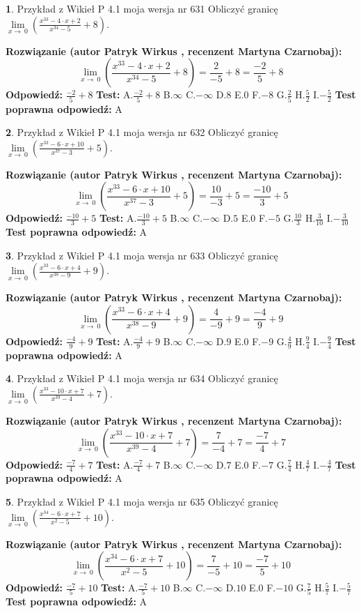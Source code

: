 \documentclass[12pt, a4paper]{article}
\theoremstyle{definition} %
\newtheorem{zad}{}
\newcommand{\zadStart}[1]{\begin{zad}#1\newline}
\newcommand{\zadStop}{\end{zad}}
\newcommand{\rozwStart}[2]{\noindent \textbf{Rozwiązanie (autor #1 , recenzent #2): }\newline}
\newcommand{\rozwStop}{\newline}
\newcommand{\odpStart}{\noindent \textbf{Odpowiedź:}\newline}
\newcommand{\odpStop}{\newline}
\newcommand{\testStart}{\noindent \textbf{Test:}\newline}
\newcommand{\testStop}{\newline}
\newcommand{\kluczStart}{\noindent \textbf{Test poprawna odpowiedź:}\newline}
\newcommand{\kluczStop}{\newline}
\begin{document}
\zadStart{Przykład z Wikieł P 4.1 moja wersja nr 631}
Obliczyć granicę $\lim\limits_{x\to\ 0}(\frac{x^{33}-4 \cdot x +2}{x^{34}-5}+8)$.
\zadStop
\rozwStart{Patryk Wirkus}{Martyna Czarnobaj}
$$\lim\limits_{x\to\ 0}(\frac{x^{33}-4 \cdot x +2}{x^{34}-5}+8)=\frac{2}{-5}+8=\frac{-2}{5}+8$$
\rozwStop
\odpStart
$\frac{-2}{5}+8$
\odpStop
\testStart
A.$\frac{-2}{5}+8$
B.$\infty$
C.$-\infty$
D.$8$
E.$0$
F.$-8$
G.$\frac{2}{5}$
H.$\frac{5}{2}$
I.$-\frac{5}{2}$
\testStop
\kluczStart
A
\kluczStop



\zadStart{Przykład z Wikieł P 4.1 moja wersja nr 632}
Obliczyć granicę $\lim\limits_{x\to\ 0}(\frac{x^{33}-6 \cdot x +10}{x^{37}-3}+5)$.
\zadStop
\rozwStart{Patryk Wirkus}{Martyna Czarnobaj}
$$\lim\limits_{x\to\ 0}(\frac{x^{33}-6 \cdot x +10}{x^{37}-3}+5)=\frac{10}{-3}+5=\frac{-10}{3}+5$$
\rozwStop
\odpStart
$\frac{-10}{3}+5$
\odpStop
\testStart
A.$\frac{-10}{3}+5$
B.$\infty$
C.$-\infty$
D.$5$
E.$0$
F.$-5$
G.$\frac{10}{3}$
H.$\frac{3}{10}$
I.$-\frac{3}{10}$
\testStop
\kluczStart
A
\kluczStop



\zadStart{Przykład z Wikieł P 4.1 moja wersja nr 633}
Obliczyć granicę $\lim\limits_{x\to\ 0}(\frac{x^{33}-6 \cdot x +4}{x^{38}-9}+9)$.
\zadStop
\rozwStart{Patryk Wirkus}{Martyna Czarnobaj}
$$\lim\limits_{x\to\ 0}(\frac{x^{33}-6 \cdot x +4}{x^{38}-9}+9)=\frac{4}{-9}+9=\frac{-4}{9}+9$$
\rozwStop
\odpStart
$\frac{-4}{9}+9$
\odpStop
\testStart
A.$\frac{-4}{9}+9$
B.$\infty$
C.$-\infty$
D.$9$
E.$0$
F.$-9$
G.$\frac{4}{9}$
H.$\frac{9}{4}$
I.$-\frac{9}{4}$
\testStop
\kluczStart
A
\kluczStop



\zadStart{Przykład z Wikieł P 4.1 moja wersja nr 634}
Obliczyć granicę $\lim\limits_{x\to\ 0}(\frac{x^{33}-10 \cdot x +7}{x^{39}-4}+7)$.
\zadStop
\rozwStart{Patryk Wirkus}{Martyna Czarnobaj}
$$\lim\limits_{x\to\ 0}(\frac{x^{33}-10 \cdot x +7}{x^{39}-4}+7)=\frac{7}{-4}+7=\frac{-7}{4}+7$$
\rozwStop
\odpStart
$\frac{-7}{4}+7$
\odpStop
\testStart
A.$\frac{-7}{4}+7$
B.$\infty$
C.$-\infty$
D.$7$
E.$0$
F.$-7$
G.$\frac{7}{4}$
H.$\frac{4}{7}$
I.$-\frac{4}{7}$
\testStop
\kluczStart
A
\kluczStop



\zadStart{Przykład z Wikieł P 4.1 moja wersja nr 635}
Obliczyć granicę $\lim\limits_{x\to\ 0}(\frac{x^{34}-6 \cdot x +7}{x^{2}-5}+10)$.
\zadStop
\rozwStart{Patryk Wirkus}{Martyna Czarnobaj}
$$\lim\limits_{x\to\ 0}(\frac{x^{34}-6 \cdot x +7}{x^{2}-5}+10)=\frac{7}{-5}+10=\frac{-7}{5}+10$$
\rozwStop
\odpStart
$\frac{-7}{5}+10$
\odpStop
\testStart
A.$\frac{-7}{5}+10$
B.$\infty$
C.$-\infty$
D.$10$
E.$0$
F.$-10$
G.$\frac{7}{5}$
H.$\frac{5}{7}$
I.$-\frac{5}{7}$
\testStop
\kluczStart
A
\kluczStop
\end{document}
